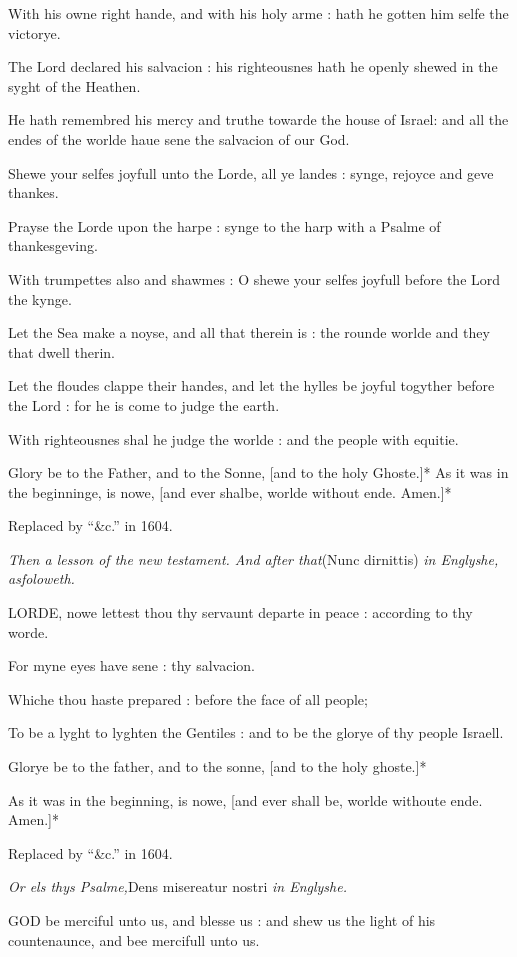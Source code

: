 With his owne right hande, and with his holy arme :
hath he gotten him selfe the victorye.

The Lord declared his salvacion : his righteousnes
hath he openly shewed in the syght of the Heathen.

He hath remembred his mercy and truthe towarde the
house of Israel: and all the endes of the worlde haue sene the salvacion
of our God.

Shewe your selfes joyfull unto the Lorde, all ye landes
: synge, rejoyce and geve thankes.

Prayse the Lorde upon the harpe : synge to the harp
with a Psalme of thankesgeving.

With trumpettes also and shawmes : O shewe your selfes
joyfull before the Lord the kynge.

Let the Sea make a noyse, and all that therein is :
the rounde worlde and they that dwell therin.

Let the floudes clappe their handes, and let the hylles
be joyful togyther before the Lord : for he is come to judge the earth.

With righteousnes shal he judge the worlde : and the
people with equitie.

Glory be to the Father, and to the Sonne, [and to the
holy Ghoste.]* As it was in the beginninge, is nowe, [and ever shalbe,
worlde without ende. Amen.]*

Replaced
by ``\&c.'' in
1604.

\emph{Then a lesson of the new testament. And after that}(Nunc dirnittis)
\emph{in Englyshe, asfoloweth.}

LORDE,
nowe lettest thou thy servaunt departe in peace : according to thy worde.

For myne eyes have sene : thy salvacion.

Whiche thou haste prepared : before the face of all
people;

To be a lyght to lyghten the Gentiles : and to be the
glorye of thy people Israell.

Glorye be to the father, and to the sonne, [and to
the holy ghoste.]*

As it was in the beginning, is nowe, [and ever shall
be, worlde withoute ende. Amen.]*

Replaced
by ``\&c.'' in
1604.

\emph{Or
els thys Psalme,}Dens misereatur nostri \emph{in Englyshe.}

GOD
be merciful unto us, and blesse us : and shew us the light of his countenaunce,
and bee mercifull unto us.

